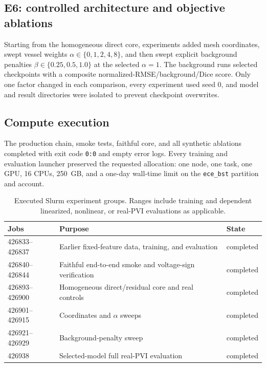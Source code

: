 \documentclass[11pt]{article}
\begin{document}
\subsection{E6: controlled architecture and objective ablations}

Starting from the homogeneous direct core, experiments added mesh coordinates,
swept vessel weights $\alpha\in\{0,1,2,4,8\}$, and then swept explicit background
penalties $\beta\in\{0.25,0.5,1.0\}$ at the selected $\alpha=1$.  The background
runs selected checkpoints with a composite normalized-RMSE/background/Dice score.
Only one factor changed in each comparison, every experiment used seed 0, and model
and result directories were isolated to prevent checkpoint overwrites.

\subsection{Compute execution}

The production chain, smoke tests, faithful core, and all synthetic ablations
completed with exit code \texttt{0:0} and empty error logs.  Every training and
evaluation launcher preserved the requested allocation: one node, one task, one
GPU, 16 CPUs, 250~GB, and a one-day wall-time limit on the \texttt{ece\_bst}
partition and account.

\begin{table}[H]
\centering
\caption{Executed Slurm experiment groups.  Ranges include training and dependent
linearized, nonlinear, or real-PVI evaluations as applicable.}
\label{tab:slurm}
\begin{tabular}{@{}lll@{}}
\toprule
Jobs & Purpose & State \\
\midrule
426833--426837 & Earlier fixed-feature data, training, and evaluation & completed \\
426840--426844 & Faithful end-to-end smoke and voltage-sign verification & completed \\
426893--426900 & Homogeneous direct/residual core and real controls & completed \\
426901--426915 & Coordinates and $\alpha$ sweeps & completed \\
426921--426929 & Background-penalty sweep & completed \\
426938 & Selected-model full real-PVI evaluation & completed \\
\bottomrule
\end{tabular}
\end{table}
\end{document}
